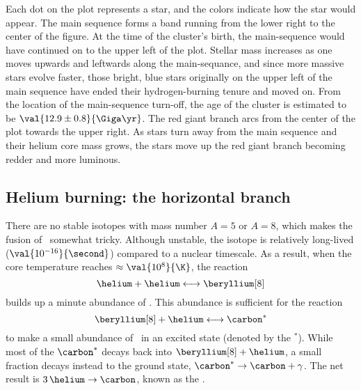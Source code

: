 Each dot on the plot represents a star, and the colors indicate how the star would appear. The main sequence forms a band running from the lower right to the center of the figure. At the time of the cluster's birth, the main-sequence would have continued on to the upper left of the plot.  Stellar mass increases as one moves upwards and leftwards along the main-sequance, and since more massive stars evolve faster, those bright, blue stars originally on the upper left of the main sequence have ended their hydrogen-burning tenure and moved on. From the location of the main-sequence turn-off, the age of the cluster is estimated\cite{VandenBerg2018Constraints-on-} to be $\val{12.9\pm0.8}{\Giga\yr}$. The red giant branch arcs from the center of the plot towards the upper right.  As stars turn away from the main sequence and their helium core mass grows, the stars move up the red giant branch becoming redder and more luminous.

\subsection{Helium burning: the horizontal branch}
There are no stable isotopes with mass number $A=5$ or $A=8$, which makes the fusion of \helium\ somewhat tricky. Although unstable, the isotope \beryllium[8] is relatively long-lived ($\val{10^{-16}}{\second}$) compared to a nuclear timescale. As a result,
when the core temperature reaches $\approx\val{10^{8}}{\K}$, the reaction
\[ \helium + \helium \longleftrightarrow\beryllium[8] \]
builds up a minute abundance of \beryllium[8]. This abundance is sufficient for the reaction
\[ \beryllium[8] + \helium \longleftrightarrow \carbon^{*} \]
to make a small abundance of \carbon\ in an excited state (denoted by the $^{*}$).  While most of the $\carbon^{*}$ decays back into $\beryllium[8]+\helium$, a small fraction decays instead to the ground state, $\carbon^{*}\to\carbon+\gamma$. The net result is $3\,\helium\to\carbon$, known as the .

